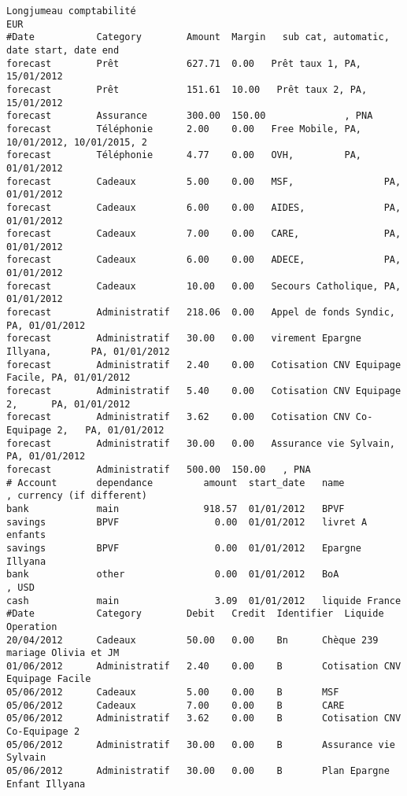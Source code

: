 \footnotesize
\begin{verbatim}
Longjumeau comptabilité
EUR
#Date           Category        Amount  Margin   sub cat, automatic, date start, date end
forecast        Prêt            627.71  0.00   Prêt taux 1, PA, 15/01/2012
forecast        Prêt            151.61  10.00   Prêt taux 2, PA, 15/01/2012
forecast        Assurance       300.00  150.00              , PNA
forecast        Téléphonie      2.00    0.00   Free Mobile, PA, 10/01/2012, 10/01/2015, 2
forecast        Téléphonie      4.77    0.00   OVH,         PA, 01/01/2012
forecast        Cadeaux         5.00    0.00   MSF,                PA, 01/01/2012
forecast        Cadeaux         6.00    0.00   AIDES,              PA, 01/01/2012
forecast        Cadeaux         7.00    0.00   CARE,               PA, 01/01/2012
forecast        Cadeaux         6.00    0.00   ADECE,              PA, 01/01/2012
forecast        Cadeaux         10.00   0.00   Secours Catholique, PA, 01/01/2012
forecast        Administratif   218.06  0.00   Appel de fonds Syndic,          PA, 01/01/2012
forecast        Administratif   30.00   0.00   virement Epargne Illyana,       PA, 01/01/2012
forecast        Administratif   2.40    0.00   Cotisation CNV Equipage Facile, PA, 01/01/2012
forecast        Administratif   5.40    0.00   Cotisation CNV Equipage 2,      PA, 01/01/2012
forecast        Administratif   3.62    0.00   Cotisation CNV Co-Equipage 2,   PA, 01/01/2012
forecast        Administratif   30.00   0.00   Assurance vie Sylvain,          PA, 01/01/2012
forecast        Administratif   500.00  150.00   , PNA
# Account       dependance         amount  start_date   name            , currency (if different)
bank            main               918.57  01/01/2012   BPVF
savings         BPVF                 0.00  01/01/2012   livret A enfants
savings         BPVF                 0.00  01/01/2012   Epargne Illyana
bank            other                0.00  01/01/2012   BoA             , USD
cash            main                 3.09  01/01/2012   liquide France
#Date           Category        Debit   Credit  Identifier  Liquide Operation
20/04/2012      Cadeaux         50.00   0.00    Bn      Chèque 239 mariage Olivia et JM
01/06/2012      Administratif   2.40    0.00    B       Cotisation CNV Equipage Facile
05/06/2012      Cadeaux         5.00    0.00    B       MSF
05/06/2012      Cadeaux         7.00    0.00    B       CARE
05/06/2012      Administratif   3.62    0.00    B       Cotisation CNV Co-Equipage 2
05/06/2012      Administratif   30.00   0.00    B       Assurance vie Sylvain
05/06/2012      Administratif   30.00   0.00    B       Plan Epargne Enfant Illyana

\end{verbatim}
